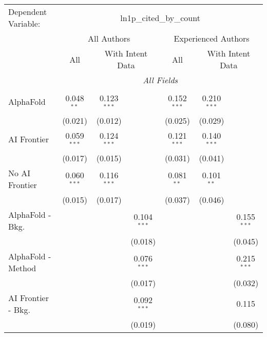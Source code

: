 \begingroup
\centering
\begin{tabular}{lcccccc}
   \tabularnewline \midrule \midrule
   Dependent Variable: & \multicolumn{6}{c}{ln1p\_cited\_by\_count}\\
 & \multicolumn{3}{c}{All Authors} & \multicolumn{3}{c}{Experienced Authors} \\
\cmidrule(lr){2-4} \cmidrule(lr){5-7}
 & \multicolumn{1}{c}{All} & \multicolumn{2}{c}{With Intent Data} & \multicolumn{1}{c}{All} & \multicolumn{2}{c}{With Intent Data} \\
\cmidrule(lr){2-2} \cmidrule(lr){3-4} \cmidrule(lr){5-5} \cmidrule(lr){6-7}
 & \multicolumn{6}{c}{\textit{All Fields}} \\ \\
   AlphaFold               & 0.048$^{**}$  & 0.123$^{***}$ &               & 0.152$^{***}$ & 0.210$^{***}$ &   \\   
                           & (0.021)       & (0.012)       &               & (0.025)       & (0.029)       &   \\   
   AI Frontier             & 0.059$^{***}$ & 0.124$^{***}$ &               & 0.121$^{***}$ & 0.140$^{***}$ &   \\   
                           & (0.017)       & (0.015)       &               & (0.031)       & (0.041)       &   \\   
   No AI Frontier          & 0.060$^{***}$ & 0.116$^{***}$ &               & 0.081$^{**}$  & 0.101$^{**}$  &   \\   
                           & (0.015)       & (0.017)       &               & (0.037)       & (0.046)       &   \\   
   AlphaFold - Bkg.        &               &               & 0.104$^{***}$ &               &               & 0.155$^{***}$\\   
                           &               &               & (0.018)       &               &               & (0.045)\\   
   AlphaFold - Method      &               &               & 0.076$^{***}$ &               &               & 0.215$^{***}$\\   
                           &               &               & (0.017)       &               &               & (0.032)\\   
   AI Frontier - Bkg.      &               &               & 0.092$^{***}$ &               &               & 0.115\\   
                           &               &               & (0.019)       &               &               & (0.080)\\   

\end{tabular}

